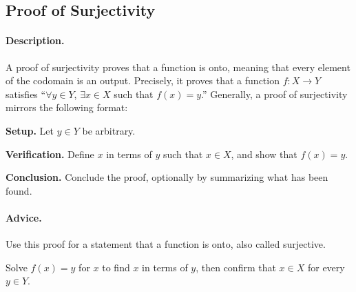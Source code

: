 \subsection{Proof of Surjectivity}
\label{subsections:techniques:universal:surjective}



\paragraph{Description.}
A proof of surjectivity proves that a function is onto, %
meaning that every element of the codomain is an output. %
Precisely, it proves that a function $f \colon X \to Y$ satisfies %
``$\forall y \in Y$, $\exists x \in X$ such that $f(x) = y$.'' %
Generally, a proof of surjectivity mirrors the following format:
\begin{enumerate}{
    \item \textbf{Setup.} %
        Let $y \in Y$ be arbitrary.
    \item \textbf{Verification.} %
        Define $x$ in terms of $y$ such that $x \in X$, %
        and show that $f(x) = y$.
    \item \textbf{Conclusion.} %
        Conclude the proof, optionally by summarizing what has been found.
}
\end{enumerate}



\paragraph{Advice.}
\begin{itemize}{
    \item Use this proof for a statement that a function is onto, %
        also called surjective.
    \item Solve $f(x) = y$ for $x$ to find $x$ in terms of $y$, %
        then confirm that $x \in X$ for every $y \in Y$.
}
\end{itemize}



